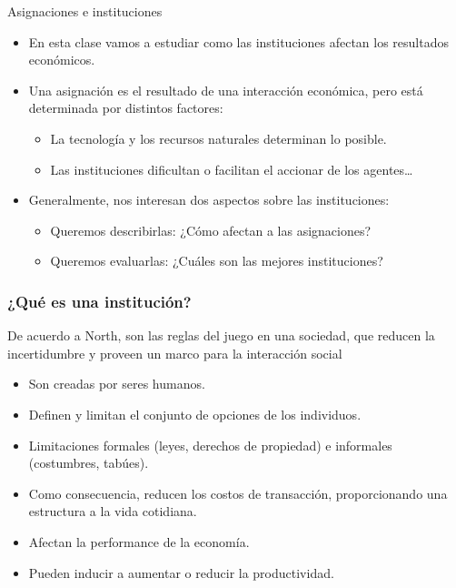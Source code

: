 \documentclass{beamer}
\begin{document}
\begin{frame}{Asignaciones e instituciones}
    \begin{itemize}
        \item En esta clase vamos a estudiar como las instituciones afectan los resultados económicos. \vspace{2mm}
        \item Una asignación es el resultado de una interacción económica, pero está determinada por distintos factores: \vspace{2mm}
        \begin{itemize}
            \item La tecnología y los recursos naturales determinan lo posible. \vspace{2mm}
            \item Las instituciones dificultan o facilitan el accionar de los agentes\dots \vspace{2mm}
        \end{itemize}
        \item Generalmente, nos interesan dos aspectos sobre las instituciones: \vspace{2mm}
        \begin{itemize}
            \item Queremos describirlas: ¿Cómo afectan a las asignaciones? \vspace{2mm}
            \item Queremos evaluarlas: ¿Cuáles son las mejores instituciones?
        \end{itemize}
    \end{itemize} 
\end{frame}

\begin{frame}
\frametitle{¿Qué es una institución?}
De acuerdo a North, son las reglas del juego en una sociedad, que reducen la incertidumbre y proveen un marco para la interacción social \vspace{1mm}
    \begin{itemize}
        \item Son creadas por seres humanos. \vspace{1mm}
        \item Definen y limitan el conjunto de opciones de los individuos. \vspace{1mm}
        \item Limitaciones formales (leyes, derechos de propiedad) e informales (costumbres, tabúes).\vspace{1mm}
        \item Como consecuencia, reducen los costos de transacción, proporcionando una estructura a la vida cotidiana.\vspace{1mm}
        \item Afectan la performance de la economía. \vspace{1mm}
        \item Pueden inducir a aumentar o reducir la productividad.
        \end{itemize} 
 
\end{frame}
\end{document}
